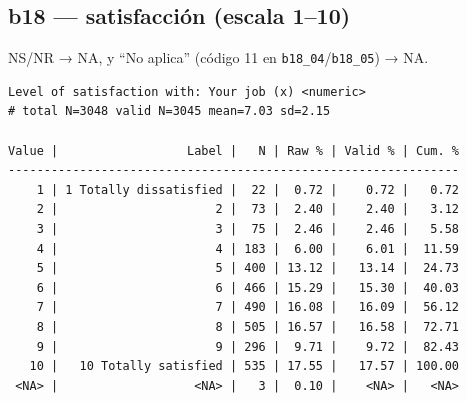 \documentclass[
  letterpaper,
  DIV=11,
  numbers=noendperiod]{scrreprt}
\newenvironment{Shaded}{\begin{snugshade}}{\end{snugshade}}
\newcommand{\AttributeTok}[1]{\textcolor[rgb]{0.40,0.45,0.13}{#1}}
\newcommand{\DecValTok}[1]{\textcolor[rgb]{0.68,0.00,0.00}{#1}}
\newcommand{\FunctionTok}[1]{\textcolor[rgb]{0.28,0.35,0.67}{#1}}
\newcommand{\NormalTok}[1]{\textcolor[rgb]{0.00,0.23,0.31}{#1}}
\newcommand{\OtherTok}[1]{\textcolor[rgb]{0.00,0.23,0.31}{#1}}
\newcommand{\SpecialCharTok}[1]{\textcolor[rgb]{0.37,0.37,0.37}{#1}}
\newcommand{\StringTok}[1]{\textcolor[rgb]{0.13,0.47,0.30}{#1}}
\begin{document}
\subsection{b18 --- satisfacción (escala
1--10)}\label{b18-satisfacciuxf3n-escala-110}

NS/NR → NA, y ``No aplica'' (código 11 en
\texttt{b18\_04}/\texttt{b18\_05}) → NA.

\begin{Shaded}
\end{Shaded}

\begin{verbatim}
Level of satisfaction with: Your job (x) <numeric> 
# total N=3048 valid N=3045 mean=7.03 sd=2.15

Value |                  Label |   N | Raw % | Valid % | Cum. %
---------------------------------------------------------------
    1 | 1 Totally dissatisfied |  22 |  0.72 |    0.72 |   0.72
    2 |                      2 |  73 |  2.40 |    2.40 |   3.12
    3 |                      3 |  75 |  2.46 |    2.46 |   5.58
    4 |                      4 | 183 |  6.00 |    6.01 |  11.59
    5 |                      5 | 400 | 13.12 |   13.14 |  24.73
    6 |                      6 | 466 | 15.29 |   15.30 |  40.03
    7 |                      7 | 490 | 16.08 |   16.09 |  56.12
    8 |                      8 | 505 | 16.57 |   16.58 |  72.71
    9 |                      9 | 296 |  9.71 |    9.72 |  82.43
   10 |   10 Totally satisfied | 535 | 17.55 |   17.57 | 100.00
 <NA> |                   <NA> |   3 |  0.10 |    <NA> |   <NA>
\end{verbatim}
\end{document}
